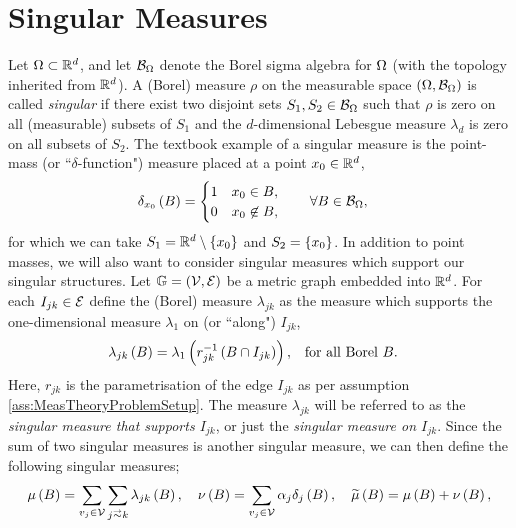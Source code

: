 \section{Singular Measures} \label{sec:SingularMeasures}

Let $\Omega\subset\mathbb{R}^d$, and let $\mathcal{B}_{\Omega}$ denote the Borel sigma algebra for $\Omega$ (with the topology inherited from $\mathbb{R}^d$).
A (Borel) measure $\rho$ on the measurable space $\left( \Omega,\mathcal{B}_{\Omega} \right)$ is called \emph{singular} if there exist two disjoint sets $S_1,S_2\in \mathcal{B}_{\Omega}$ such that $\rho$ is zero on all (measurable) subsets of $S_1$ and the $d$-dimensional Lebesgue measure $\lambda_d$ is zero on all subsets of $S_2$.
The textbook example of a singular measure is the point-mass (or ``$\delta$-function") measure placed at a point $x_0\in\mathbb{R}^d$,
\begin{align*}
	\delta_{x_0}\left( B \right) &= \begin{cases} 1 & x_0\in B, \\ 0 & x_0\not\in B, \end{cases}
	\qquad \forall B\in\mathcal{B}_{\Omega},
\end{align*}
for which we can take $S_1=\mathbb{R}^d\setminus\left\{ x_0 \right\}$ and $S_2=\left\{ x_0 \right\}$.
In addition to point masses, we will also want to consider singular measures which support our singular structures.
Let $\mathbb{G}=\left( \mathcal{V}, \mathcal{E} \right)$ be a metric graph embedded into $\mathbb{R}^d$.
For each $I_{jk}\in\mathcal{E}$ define the (Borel) measure $\lambda_{jk}$ as the measure which supports the one-dimensional measure $\lambda_1$ on (or ``along") $I_{jk}$,
\begin{align*}
	\lambda_{jk}\left( B \right) = \lambda_{1}\left( r_{jk}^{-1}\left( B \cap I_{jk} \right) \right),
	&\quad\text{for all Borel } B.
\end{align*}
Here, $r_{jk}$ is the parametrisation of the edge $I_{jk}$ as per assumption \ref{ass:MeasTheoryProblemSetup}.
The measure $\lambda_{jk}$ will be referred to as the \emph{singular measure that supports $I_{jk}$}, or just the \emph{singular measure on $I_{jk}$}.
Since the sum of two singular measures is another singular measure, we can then define the following singular measures;
\begin{align*}
	\ddmes\bracs{B} = \sum_{v_j\in \vertSet}\sum_{j\conLeft k} \lambda_{jk}\bracs{B},
	\quad
	\nu\bracs{B} = \sum_{v_j\in\vertSet}\alpha_j\delta_j\bracs{B},
	\quad
	\dddmes\bracs{B} = \ddmes\bracs{B} + \nu\bracs{B},
\end{align*}
